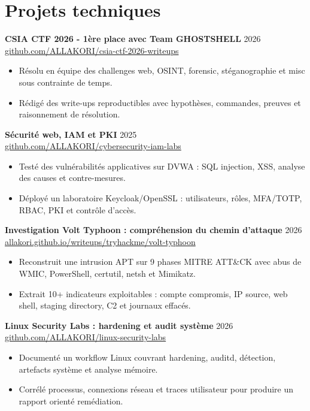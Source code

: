 \documentclass[10pt,a4paper]{article}
\begin{document}
\section{Projets techniques}
\textbf{CSIA CTF 2026 - 1ère place avec Team GHOSTSHELL} \hfill 2026\\
\href{https://github.com/ALLAKORI/csia-ctf-2026-writeups}{github.com/ALLAKORI/csia-ctf-2026-writeups}
\begin{itemize}
  \item Résolu en équipe des challenges web, OSINT, forensic, stéganographie et misc sous contrainte de temps.
  \item Rédigé des write-ups reproductibles avec hypothèses, commandes, preuves et raisonnement de résolution.
\end{itemize}

\textbf{Sécurité web, IAM et PKI} \hfill 2025\\
\href{https://github.com/ALLAKORI/cybersecurity-iam-labs}{github.com/ALLAKORI/cybersecurity-iam-labs}
\begin{itemize}
  \item Testé des vulnérabilités applicatives sur DVWA : SQL injection, XSS, analyse des causes et contre-mesures.
  \item Déployé un laboratoire Keycloak/OpenSSL : utilisateurs, rôles, MFA/TOTP, RBAC, PKI et contrôle d'accès.
\end{itemize}

\textbf{Investigation Volt Typhoon : compréhension du chemin d'attaque} \hfill 2026\\
\href{https://allakori.github.io/writeups/posts/volt-typhoon-intrusion/}{allakori.github.io/writeups/tryhackme/volt-typhoon}
\begin{itemize}
  \item Reconstruit une intrusion APT sur 9 phases MITRE ATT\&CK avec abus de WMIC, PowerShell, certutil, netsh et Mimikatz.
  \item Extrait 10+ indicateurs exploitables : compte compromis, IP source, web shell, staging directory, C2 et journaux effacés.
\end{itemize}

\textbf{Linux Security Labs : hardening et audit système} \hfill 2026\\
\href{https://github.com/ALLAKORI/linux-security-labs}{github.com/ALLAKORI/linux-security-labs}
\begin{itemize}
  \item Documenté un workflow Linux couvrant hardening, auditd, détection, artefacts système et analyse mémoire.
  \item Corrélé processus, connexions réseau et traces utilisateur pour produire un rapport orienté remédiation.
\end{itemize}
\end{document}
